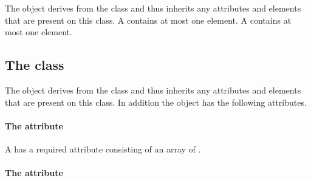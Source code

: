 


The \CSGHomogeneousTransformation object derives from the
\CSGTransformation class and thus inherits any attributes and elements
that are present on this class.
A \CSGHomogeneousTransformation contains at most one
\TransformationComponent element.
A \CSGHomogeneousTransformation contains at most one
\TransformationComponent element.
\subsection{The  class}
\label{transformationcomponent-class}




The \TransformationComponent object derives from the \SBase class and
thus inherits any attributes and elements that are present on this
class.
In addition the \TransformationComponent object has the following
attributes.

\paragraph{The \fixttspace{} attribute}

A \TransformationComponent has a required attribute 
consisting of an array of .


\paragraph{The \fixttspace{} attribute}

